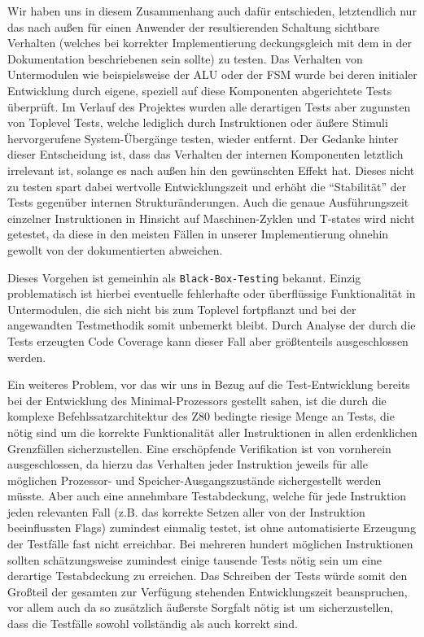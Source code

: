 \documentclass[ngerman, cd=lightcolor]{tudscrreprt}
\begin{document}
Wir haben uns in diesem Zusammenhang auch dafür entschieden, letztendlich nur
das nach außen für einen Anwender der resultierenden Schaltung sichtbare
Verhalten (welches bei korrekter Implementierung deckungsgleich mit dem in der
Dokumentation beschriebenen sein sollte) zu testen. Das Verhalten von
Untermodulen wie beispielsweise der ALU oder der FSM wurde bei deren initialer
Entwicklung durch eigene, speziell auf diese Komponenten abgerichtete Tests
überprüft. Im Verlauf des Projektes wurden alle derartigen Tests aber zugunsten
von Toplevel Tests, welche lediglich durch Instruktionen oder äußere Stimuli
hervorgerufene System-Übergänge testen, wieder entfernt. Der Gedanke hinter
dieser Entscheidung ist, dass das Verhalten der internen Komponenten letztlich
irrelevant ist, solange es nach außen hin den gewünschten Effekt hat.
Dieses nicht zu testen spart dabei wertvolle Entwicklungszeit und erhöht die
``Stabilität'' der Tests gegenüber internen Strukturänderungen.
Auch die genaue Ausführungszeit einzelner Instruktionen in Hinsicht auf
Maschinen-Zyklen und T-states wird nicht getestet, da diese in den meisten
Fällen in unserer Implementierung ohnehin gewollt von der dokumentierten
abweichen.

Dieses Vorgehen ist gemeinhin als \texttt{Black-Box-Testing} bekannt. Einzig
problematisch ist hierbei eventuelle fehlerhafte oder überflüssige
Funktionalität in Untermodulen, die sich nicht bis zum Toplevel fortpflanzt und
bei der angewandten Testmethodik somit unbemerkt bleibt. Durch Analyse der
durch die Tests erzeugten Code Coverage kann dieser Fall aber größtenteils
ausgeschlossen werden.

Ein weiteres Problem, vor das wir uns in Bezug auf die Test-Entwicklung bereits
bei der Entwicklung des Minimal-Prozessors gestellt sahen, ist die durch die
komplexe Befehlssatzarchitektur des Z80 bedingte riesige Menge an Tests, die
nötig sind um die korrekte Funktionalität aller Instruktionen in allen
erdenklichen Grenzfällen sicherzustellen. Eine erschöpfende Verifikation ist
von vornherein ausgeschlossen, da hierzu das Verhalten jeder Instruktion
jeweils für alle möglichen Prozessor- und Speicher-Ausgangszustände
sichergestellt werden müsste. Aber auch eine annehmbare Testabdeckung, welche
für jede Instruktion jeden relevanten Fall (z.B. das korrekte Setzen aller von
der Instruktion beeinflussten Flags) zumindest einmalig testet, ist ohne
automatisierte Erzeugung der Testfälle fast nicht erreichbar. Bei mehreren
hundert möglichen Instruktionen sollten schätzungsweise zumindest einige
tausende Tests nötig sein um eine derartige Testabdeckung zu erreichen. Das
Schreiben der Tests würde somit den Großteil der gesamten zur Verfügung
stehenden Entwicklungszeit beanspruchen, vor allem auch da so zusätzlich
äußerste Sorgfalt nötig ist um sicherzustellen, dass die Testfälle sowohl
vollständig als auch korrekt sind.
\end{document}

